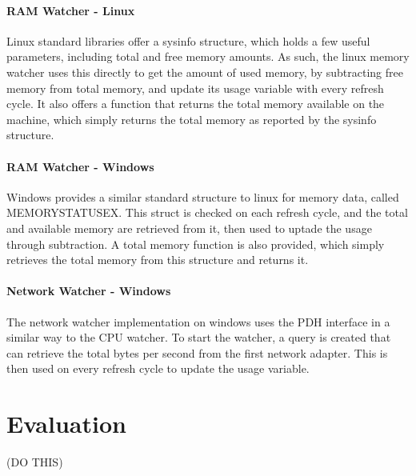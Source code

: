\documentclass{l3proj}
\begin{document}
\subsubsection{RAM Watcher - Linux}

Linux standard libraries offer a sysinfo structure, which holds a few useful parameters, including total and free memory amounts. As such, the linux memory watcher uses this directly to get the amount of used memory, by subtracting free memory from total memory, and update its usage variable with every refresh cycle. It also offers a function that returns the total memory available on the machine, which simply returns the total memory as reported by the sysinfo structure.

\subsubsection{RAM Watcher - Windows}

Windows provides a similar standard structure to linux for memory data, called MEMORYSTATUSEX. This struct is checked on each refresh cycle, and the total and available memory are retrieved from it, then used to uptade the usage through subtraction. A total memory function is also provided, which simply retrieves the total memory from this structure and returns it.

\subsubsection{Network Watcher - Windows}

The network watcher implementation on windows uses the PDH interface in a similar way to the CPU watcher. To start the watcher, a query is created that can retrieve the total bytes per second from the first network adapter. This is then used on every refresh cycle to update the usage variable.



\chapter{Evaluation}

(DO THIS)
\end{document}
